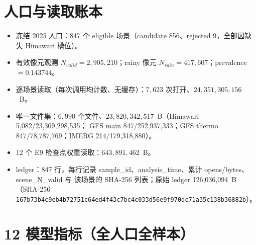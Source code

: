\documentclass[UTF8,a4paper,fontset=windows,11pt]{ctexart}
\begin{document}
\section{人口与读取账本}

\begin{itemize}
\item 冻结 2025 人口：847 个 eligible 场景（candidate 856、rejected 9，全部因缺失 Himawari 槽位）。
\item 有效像元观测 $N_{valid}=2{,}905{,}210$；rainy 像元 $N_{rain}=417{,}607$；prevalence $=0.143744$。
\item 逐场景读取（每次调用均计数、无缓存）：$7{,}623$ 次打开、$24{,}351{,}305{,}156$~B。
\item 唯一文件集：$6{,}990$ 个文件、$23{,}820{,}342{,}517$~B（Himawari 5{,}082/23{,}309{,}298{,}535；
GFS main 847/252{,}937{,}333；GFS thermo 847/78{,}787{,}769；IMERG 214/179{,}318{,}880）。
\item 12 个 E9 检查点权重读取：$643{,}891{,}462$~B。
\item ledger：847 行，每行记录 sample\_id、analysis\_time、累计 opens/bytes、scene\_N\_valid 与
该场景的 SHA-256 列表；原始 ledger 126{,}036{,}094~B（SHA-256
\texttt{167b73b4c9eb4b72751c64ed4f43c7bc4c033d56e9f970dc71a35c138b36882b}）。
\end{itemize}

\section{12 模型指标（全人口全样本）}
\end{document}
